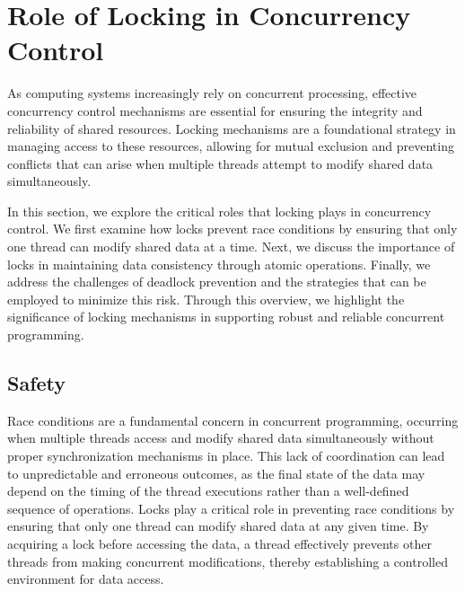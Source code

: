 


\section{Role of Locking in Concurrency Control}
As computing systems increasingly rely on concurrent processing, effective concurrency control mechanisms are essential for ensuring the integrity and reliability of shared resources. Locking mechanisms are a foundational strategy in managing access to these resources, allowing for mutual exclusion and preventing conflicts that can arise when multiple threads attempt to modify shared data simultaneously.

In this section, we explore the critical roles that locking plays in concurrency control. We first examine how locks prevent race conditions by ensuring that only one thread can modify shared data at a time. Next, we discuss the importance of locks in maintaining data consistency through atomic operations. Finally, we address the challenges of deadlock prevention and the strategies that can be employed to minimize this risk. Through this overview, we highlight the significance of locking mechanisms in supporting robust and reliable concurrent programming.


\subsection{Safety}

Race conditions are a fundamental concern in concurrent programming, occurring when multiple threads access and modify shared data simultaneously without proper synchronization mechanisms in place. This lack of coordination can lead to unpredictable and erroneous outcomes, as the final state of the data may depend on the timing of the thread executions rather than a well-defined sequence of operations. Locks play a critical role in preventing race conditions by ensuring that only one thread can modify shared data at any given time. By acquiring a lock before accessing the data, a thread effectively prevents other threads from making concurrent modifications, thereby establishing a controlled environment for data access.

